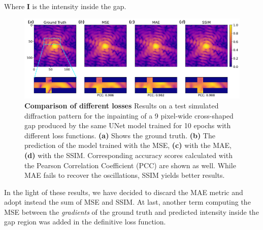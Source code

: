 Where \textbf{I} is the intensity inside the gap.

\begin{figure}[h]
    \includegraphics[width=\textwidth]{figures/Inpainting/loss_comparison.pdf}
    \caption{\textbf{Comparison of different losses} Results on a test simulated diffraction pattern for the inpainting 
    of a 9 pixel-wide cross-shaped gap produced by the same UNet model trained for 10 epochs with different loss functions. 
    \textbf{(a)} Shows the ground truth. \textbf{(b)} The prediction of the model trained with the MSE, \textbf{(c)} 
    with the MAE, \textbf{(d)} with the SSIM. Corresponding accuracy scores calculated with the Pearson Correlation 
    Coefficient (PCC) are shown as well. While MAE fails to recover the oscillations, SSIM yields better results.}
    \label{fig:loss_comparison}
\end{figure}

In the light of these results, we have decided to discard the MAE metric and adopt instead the sum of MSE and SSIM. 
At last, another term computing the MSE between the \textit{gradients} of the ground truth and predicted intensity inside
the gap region was added in the definitive loss function.\\

